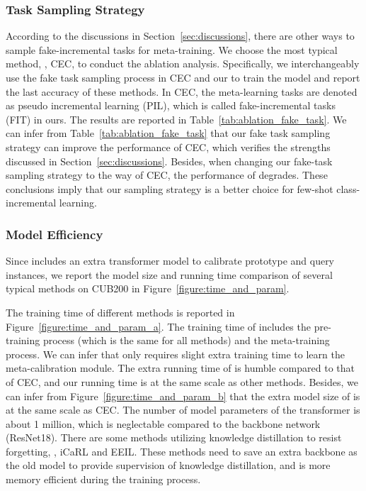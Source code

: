 \subsubsection{Task Sampling Strategy}
According to the discussions in Section~\ref{sec:discussions}, there are other ways to sample fake-incremental tasks for meta-training. We choose the most typical method, \ie, CEC, to conduct the ablation analysis. Specifically, we interchangeably use the fake task sampling process in CEC and our \name to train the model and report the last accuracy of these methods. In CEC, the meta-learning tasks are denoted as pseudo incremental learning (PIL), which is called fake-incremental tasks (FIT) in ours. The results are reported in Table~\ref{tab:ablation_fake_task}. We can infer from Table~\ref{tab:ablation_fake_task} that our fake task sampling strategy can improve the performance of CEC, which verifies the strengths discussed in Section~\ref{sec:discussions}. Besides, when changing our fake-task sampling strategy to the way of CEC, the performance of \name degrades. These conclusions imply that our sampling strategy is a better choice for few-shot class-incremental learning. 

\subsubsection{Model Efficiency}
Since \name includes an extra transformer model to calibrate prototype and query instances, we report the model size and running time comparison of several typical methods on CUB200 in Figure~\ref{figure:time_and_param}.

The training time of different methods is reported in Figure~\ref{figure:time_and_param_a}. The training time of \name includes the pre-training process (which is the same for all methods) and the meta-training process.
We can infer that \name only requires slight extra training time to learn the meta-calibration module. The extra running time of \name is humble compared to that of CEC, and our running time is at the same scale as other methods. Besides, we can infer from Figure~\ref	{figure:time_and_param_b} that the extra model size of \name is at the same scale as CEC. The number of model parameters of the transformer is about 1 million, which is neglectable compared to the backbone network (ResNet18). There are some methods utilizing knowledge distillation to resist forgetting, \eg, iCaRL and EEIL. These methods need to save an extra backbone as the old model to provide supervision of knowledge distillation, and \name is more memory efficient during the training process.




